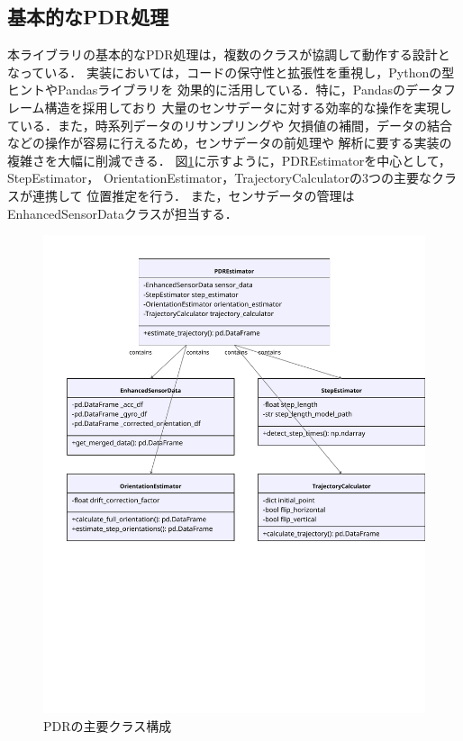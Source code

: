 
\subsection{基本的なPDR処理}

本ライブラリの基本的なPDR処理は，複数のクラスが協調して動作する設計となっている．
実装においては，コードの保守性と拡張性を重視し，Pythonの型ヒントやPandasライブラリを
効果的に活用している．特に，Pandasのデータフレーム構造を採用しており
大量のセンサデータに対する効率的な操作を実現している．また，時系列データのリサンプリングや
欠損値の補間，データの結合などの操作が容易に行えるため，センサデータの前処理や
解析に要する実装の複雑さを大幅に削減できる．
図\ref{fig:pdr-class}に示すように，PDREstimatorを中心として，StepEstimator，
OrientationEstimator，TrajectoryCalculatorの3つの主要なクラスが連携して
位置推定を行う．
また，センサデータの管理はEnhancedSensorDataクラスが担当する．

\begin{figure}[H]
    \centering
    \includegraphics[width=\linewidth]{../image/pdr_figure.pdf}
    \caption{PDRの主要クラス構成}
    \label{fig:pdr-class}
\end{figure}

